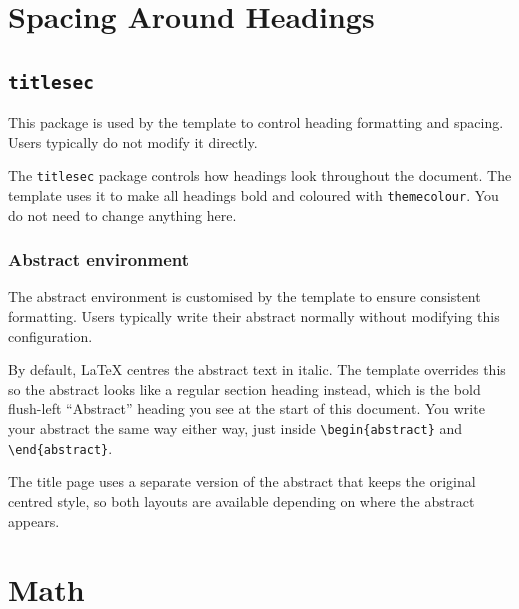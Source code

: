 \section{Spacing Around Headings}

\subsection{\texttt{titlesec}}
\noindent\colorbox{themecolour!15}{\parbox{\linewidth}{\small This package is used by the template to control heading formatting and spacing. Users typically do not modify it directly.}}\vspace{0.5\baselineskip}

The \texttt{titlesec} package controls how headings look throughout the document. The template uses it to make all headings bold and coloured with \texttt{themecolour}. You do not need to change anything here.

\subsubsection{Abstract environment}
\noindent\colorbox{themecolour!15}{\parbox{\linewidth}{\small The abstract environment is customised by the template to ensure consistent formatting. Users typically write their abstract normally without modifying this configuration.}}\vspace{0.5\baselineskip}

By default, \LaTeX{} centres the abstract text in italic. The template overrides this so the abstract looks like a regular section heading instead, which is the bold flush-left ``Abstract'' heading you see at the start of this document. You write your abstract the same way either way, just inside \texttt{\textbackslash begin\{abstract\}} and \texttt{\textbackslash end\{abstract\}}.

The title page uses a separate version of the abstract that keeps the original centred style, so both layouts are available depending on where the abstract appears.

\section{Math}

